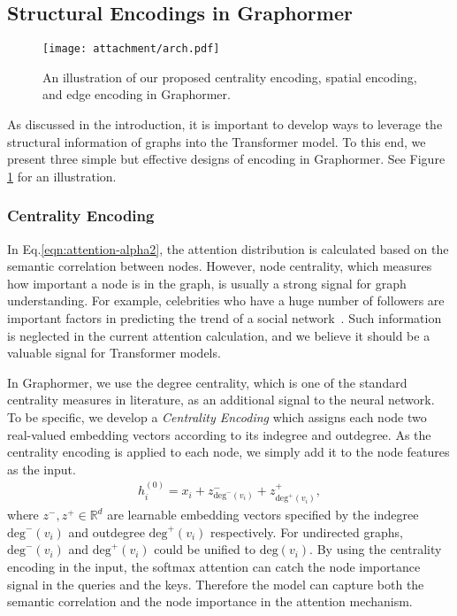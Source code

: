 \documentclass{article}
\begin{document}
\subsection{Structural Encodings in Graphormer}
\label{sec:incorporate_graph_structure}


\begin{figure}[t]
    \centering
    \texttt{[image: attachment/arch.pdf]}
    \caption{An illustration of our proposed centrality encoding, spatial encoding, and edge encoding in Graphormer.}
    \label{fig:model}
\end{figure}

As discussed in the introduction, it is important to develop ways to leverage the structural information of graphs into the Transformer model. To this end, we present three simple but effective designs of encoding in Graphormer. See Figure \ref{fig:model} for an illustration.


\subsubsection{Centrality Encoding}
In Eq.\ref{eqn:attention-alpha2}, the attention distribution is calculated based on the semantic correlation between nodes. However, node centrality, which measures how important a node is in the graph, is usually a strong signal for graph understanding. For example, celebrities who have a huge number of followers are important factors in predicting the trend of a social network~\cite{marwick2011see,marshall2010promotion}. 
Such information is neglected in the current attention calculation, and we believe it should be a valuable signal for Transformer models. 

In Graphormer, we use the degree centrality, which is one of the standard centrality measures in literature, as an additional signal to the neural network. To be specific, we develop a \emph{Centrality Encoding} which assigns each node two real-valued embedding vectors according to its indegree and outdegree. As the centrality encoding is applied to each node, we simply add it to the node features as the input.
\begin{align}
\label{eqn:degree_encoding}
    h_i^{(0)} = x_i + z^-_{\text{deg}^{-}(v_i)} + z^+_{\text{deg}^{+}(v_i)},
\end{align}
where $z^{-}, z^{+} \in \mathbb{R}^d$ are learnable embedding vectors specified by the indegree $\text{deg}^{-}(v_i)$ and outdegree $\text{deg}^{+}(v_i)$ respectively. For undirected graphs, $\text{deg}^{-}(v_i)$ and $\text{deg}^{+}(v_i)$ could be unified to $\text{deg}(v_i)$. By using the centrality encoding in the input, the softmax attention can catch the node importance signal in the queries and the keys. Therefore the model can capture both the semantic correlation and the node importance in the attention mechanism.
\end{document}

